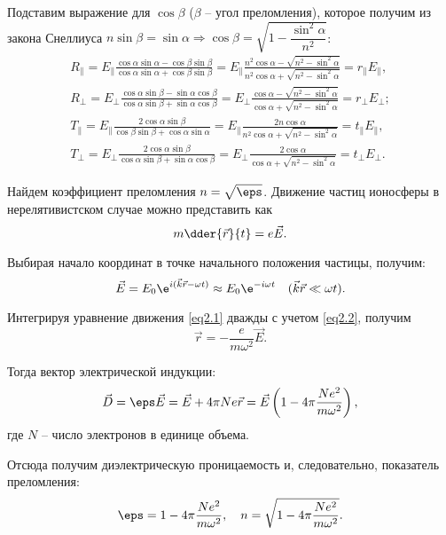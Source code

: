 Подставим выражение для \( \cos\beta \) (\( \beta \) -- угол преломления),
которое получим из закона Снеллиуса \( n\sin\beta = \sin\alpha \Rightarrow
\cos\beta = \sqrt{1 - \dfrac{\sin^2\alpha}{n^2}} \):
\begin{gather*}
    R_\| = E_\|\frac{\cos\alpha\sin\alpha - \cos\beta\sin\beta}
    {\cos\alpha\sin\alpha + \cos\beta\sin\beta} = E_\|\frac{n^2\cos\alpha-
    \sqrt{n^2-\sin^2\alpha}}{n^2\cos\alpha + \sqrt{n^2 - \sin^2\alpha}} =
    r_\|E_\|, \\
    R_\perp = E_\perp\frac{\cos\alpha\sin\beta - \sin\alpha\cos\beta}
    {\cos\alpha\sin\beta + \sin\alpha\cos\beta} = E_\perp\frac{\cos\alpha -
    \sqrt{n^2-\sin^2\alpha}}{\cos\alpha + \sqrt{n^2-\sin^2\alpha}} = 
    r_\perp E_\perp; \\
    T_\| = E_\|\frac{2\cos\alpha\sin\beta}{\cos\beta\sin\beta + \cos\alpha
    \sin\alpha} = E_\|\frac{2n\cos\alpha}{n^2\cos\alpha + \sqrt{n^2-
    \sin^2\alpha}} = t_\|E_\|, \\
    T_\perp = E_\perp\frac{2\cos\alpha\sin\beta}{\cos\alpha\sin\beta +
    \sin\alpha\cos\beta} = E_\perp\frac{2\cos\alpha}{\cos\alpha + \sqrt{n^2-
    \sin^2\alpha}} = t_\perp E_\perp.
\end{gather*}

Найдем коэффициент преломления \( n = \sqrt{\eps} \). Движение частиц ионосферы
в нерелятивистском случае можно представить как
\begin{equation}
    m\dder{\vec{r}}{t} = e\vec{E}.
    \label{eq2.1}
\end{equation}

Выбирая начало координат в точке начального положения частицы, получим:
\begin{equation}
    \vec{E} = E_0\e^{i(\vec{k}\vec{r} - \omega t)} \approx
    E_0\e^{-i\omega t} \quad (\vec{k}\vec{r} \ll \omega t).
    \label{eq2.2}
\end{equation}

Интегрируя уравнение движения \eqref{eq2.1} дважды с учетом \eqref{eq2.2},
получим
\[
    \vec{r} = -\frac{e}{m\omega^2}\vec{E}.
\]

Тогда вектор электрической индукции:
\[
    \vec{D} = \eps\vec{E} = \vec{E} + 4\pi Ne\vec{r} = \vec{E}
    \left(1 - 4\pi\frac{Ne^2}{m\omega^2}\right),
\]
где \( N \) -- число электронов в единице объема.

Отсюда получим диэлектрическую проницаемость и, следовательно, показатель
преломления:
\[
    \eps = 1 - 4\pi\frac{Ne^2}{m\omega^2}, \quad n = \sqrt{1 - 4\pi\frac{Ne^2}
    {m\omega^2}}.
\]

